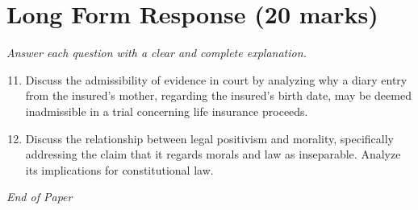 \documentclass[12pt]{article}
\begin{document}
\section*{Long Form Response (20 marks)}
\textit{Answer each question with a clear and complete explanation.}
\begin{enumerate}[label=\arabic*.]
\setcounter{enumi}{10}
\item Discuss the admissibility of evidence in court by analyzing why a diary entry from the insured's mother, regarding the insured's birth date, may be deemed inadmissible in a trial concerning life insurance proceeds.
\item Discuss the relationship between legal positivism and morality, specifically addressing the claim that it regards morals and law as inseparable. Analyze its implications for constitutional law.
\end{enumerate}

\vfill
\noindent\textit{End of Paper}
\end{document}
